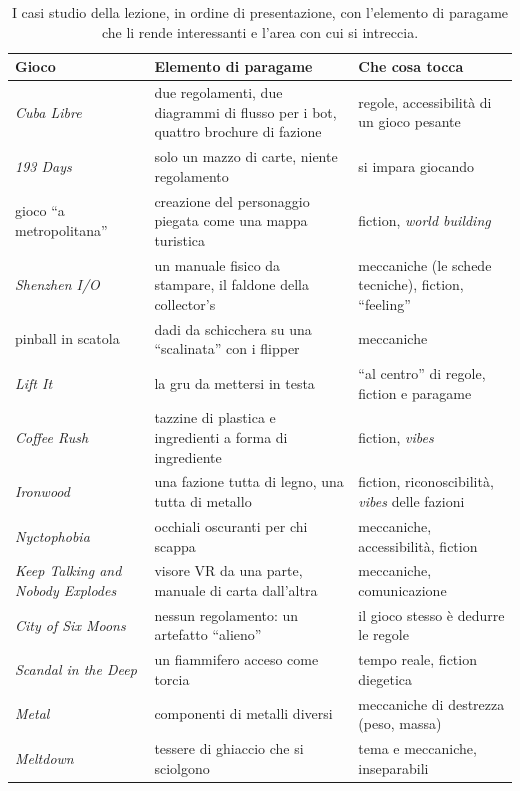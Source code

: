 \begin{table}[htbp]
\centering
\small
\begin{tabular}{@{}p{3.3cm}p{5.3cm}p{4.6cm}@{}}
\toprule
\textbf{Gioco} & \textbf{Elemento di paragame} & \textbf{Che cosa tocca} \\
\midrule
\emph{Cuba Libre} & due regolamenti, due diagrammi di flusso per i bot, quattro
brochure di fazione & regole, accessibilità di un gioco pesante \\
\emph{193 Days} & solo un mazzo di carte, niente regolamento & si impara giocando \\
gioco ``a metropolitana'' & creazione del personaggio piegata come una mappa turistica
& fiction, \emph{world building} \\
\emph{Shenzhen I/O} & un manuale fisico da stampare, il faldone della collector's &
meccaniche (le schede tecniche), fiction, ``feeling'' \\
pinball in scatola & dadi da schicchera su una ``scalinata'' con i flipper & meccaniche \\
\emph{Lift It} & la gru da mettersi in testa & ``al centro'' di regole, fiction e
paragame \\
\emph{Coffee Rush} & tazzine di plastica e ingredienti a forma di ingrediente & fiction,
\emph{vibes} \\
\emph{Ironwood} & una fazione tutta di legno, una tutta di metallo & fiction,
riconoscibilità, \emph{vibes} delle fazioni \\
\emph{Nyctophobia} & occhiali oscuranti per chi scappa & meccaniche, accessibilità,
fiction \\
\emph{Keep Talking and Nobody Explodes} & visore VR da una parte, manuale di carta
dall'altra & meccaniche, comunicazione \\
\emph{City of Six Moons} & nessun regolamento: un artefatto ``alieno'' & il gioco stesso
è dedurre le regole \\
\emph{Scandal in the Deep} & un fiammifero acceso come torcia & tempo reale, fiction
diegetica \\
\emph{Metal} & componenti di metalli diversi & meccaniche di destrezza (peso, massa) \\
\emph{Meltdown} & tessere di ghiaccio che si sciolgono & tema e meccaniche, inseparabili
\\
\bottomrule
\end{tabular}
\caption{I casi studio della lezione, in ordine di presentazione, con l'elemento di
paragame che li rende interessanti e l'area con cui si intreccia.}
\label{a10:tab:casi}
\end{table}


